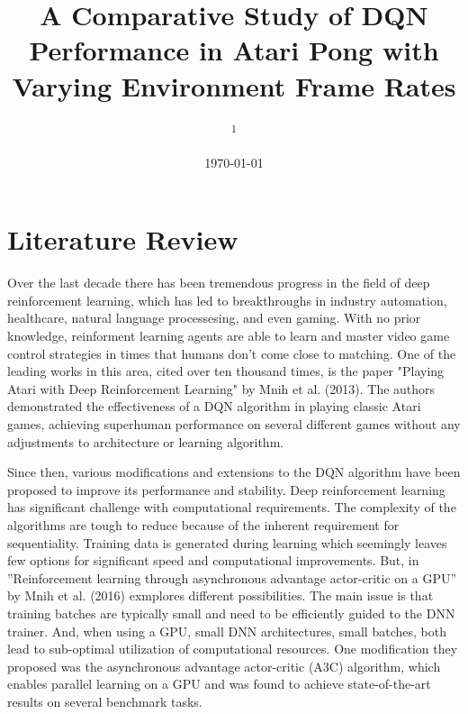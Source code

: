 \documentclass[12pt, a4paper, twocolumn]{article} %
\title{A Comparative Study of DQN Performance in Atari Pong with Varying Environment Frame Rates} %
\author{
	\authorstyle{James Bardin \textsuperscript{1}} %
	\newline\newline %
	\textsuperscript{1}\institution{Harvard University, Cambridge, Massachusetts}\\ %
}
\date{\today} %
\begin{document}
\maketitle %

\thispagestyle{firstpage} %




\section{Literature Review}

Over the last decade there has been tremendous progress in the field of deep reinforcement learning, which has led to breakthroughs in industry automation, healthcare, natural language processesing, and even gaming. With no prior knowledge, reinforment learning agents are able to learn and master video game control strategies in times that humans don't come close to matching. One of the leading works in this area, cited over ten thousand times, is the paper "Playing Atari with Deep Reinforcement Learning" by Mnih et al. (2013). The authors demonstrated the effectiveness of a DQN algorithm in playing classic Atari games, achieving superhuman performance on several different games without any adjustments to architecture or learning algorithm.

Since then, various modifications and extensions to the DQN algorithm have been proposed to improve its performance and stability. Deep reinforcement learning has significant challenge with computational requirements. The complexity of the algorithms are tough to reduce because of the inherent requirement for sequentiality. Training data is generated during learning which seemingly leaves few options for significant speed and computational improvements. But, in ”Reinforcement learning through asynchronous advantage actor-critic on a GPU” by Mnih et al. (2016) exmplores different possibilities. The main issue is that training batches are typically small and need to be efficiently guided to the DNN trainer. And, when using a GPU, small DNN architectures, small batches, both lead to sub-optimal utilization of computational resources. One modification they proposed was the asynchronous advantage actor-critic (A3C) algorithm, which enables parallel learning on a GPU and was found to achieve state-of-the-art results on several benchmark tasks.
\end{document}
